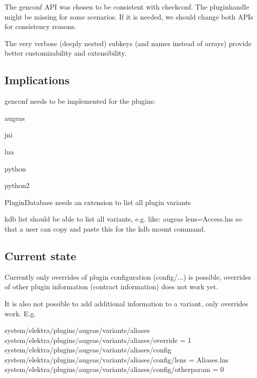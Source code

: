 \begin{DoxyItemize}
\item The {\ttfamily genconf} A\+PI was chosen to be consistent with {\ttfamily checkconf}. The pluginhandle might be missing for some scenarios. If it is needed, we should change both A\+P\+Is for consistency reasons.
\item The very verbose (deeply nested) subkeys (and names instead of arrays) provide better customizability and extensibility.
\end{DoxyItemize}

\subsection*{Implications}


\begin{DoxyItemize}
\item {\ttfamily genconf} needs to be implemented for the plugins\+:
\begin{DoxyItemize}
\item augeas
\item jni
\item lua
\item python
\item python2
\end{DoxyItemize}
\item {\ttfamily Plugin\+Database} needs an extension to list all plugin variants
\item {\ttfamily kdb list} should be able to list all variants, e.\+g. like\+: {\ttfamily augeas lens=Access.\+lns} so that a user can copy and paste this for the {\ttfamily kdb mount} command.
\end{DoxyItemize}

\subsection*{Current state}

Currently only overrides of plugin configuration ({\ttfamily config/...}) is possible, overrides of other plugin information (contract information) does not work yet.

It is also not possible to add additional information to a variant, only overrides work. E.\+g.


\begin{DoxyCode}
system/elektra/plugins/augeas/variants/aliases
system/elektra/plugins/augeas/variants/aliases/override = 1
system/elektra/plugins/augeas/variants/aliases/config
system/elektra/plugins/augeas/variants/aliases/config/lens = Aliases.lns
system/elektra/plugins/augeas/variants/aliases/config/otherparam = 0
\end{DoxyCode}


